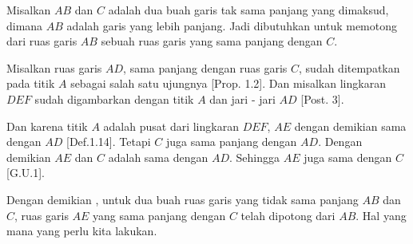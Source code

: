 \documentclass[a4paper]{book}
\begin{document}
\begin{center}
\end{center}

Misalkan $AB$ dan $C$ adalah dua buah garis tak sama panjang yang dimaksud,
dimana $AB$ adalah garis yang lebih panjang. Jadi dibutuhkan untuk memotong
dari ruas garis $AB$ sebuah ruas garis yang sama panjang dengan $C$.

Misalkan ruas garis $AD$, sama panjang dengan ruas garis $C$, sudah ditempatkan
pada titik $A$ sebagai salah satu ujungnya [Prop. 1.2]. Dan misalkan lingkaran
$DEF$ sudah digambarkan dengan titik $A$ dan jari - jari $AD$ [Post. 3].

Dan karena titik $A$ adalah pusat dari lingkaran $DEF$, $AE$ dengan demikian
sama dengan $AD$ [Def.1.14]. Tetapi $C$ juga sama panjang dengan $AD$. Dengan 
demikian $AE$ dan $C$ adalah sama dengan $AD$. Sehingga $AE$ juga sama dengan
$C$ [G.U.1].

Dengan demikian , untuk dua buah ruas garis yang tidak sama panjang $AB$ 
dan $C$, ruas garis $AE$ yang sama panjang dengan $C$ telah dipotong dari 
$AB$. Hal yang mana yang perlu kita lakukan.

\section*{\centering \thesection} 
\end{document}
